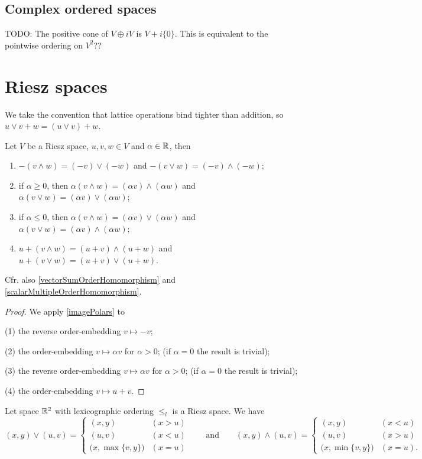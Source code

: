 \subsection{Complex ordered spaces}
TODO: The positive cone of $V\oplus iV$ is $V+i\{0\}$. This is equivalent to the pointwise ordering on $V^2$??


\section{Riesz spaces}

We take the convention that lattice operations bind tighter than addition, so $u\vee v + w = (u\vee v) + w$.

\begin{lemma} \label{lemmaRieszSpaces}
Let $V$ be a Riesz space, $u,v,w\in V$ and $\alpha\in \mathbb{R}$, then
\begin{enumerate}
\item $-(v \wedge w) = (-v)\vee (-w)$ and $-(v \vee w) = (-v)\wedge (-w)$;
\item if $\alpha \geq 0$, then $\alpha(v \wedge w) = (\alpha v)\wedge (\alpha w)$ and $\alpha(v \vee w) = (\alpha v)\vee (\alpha w)$;
\item if $\alpha \leq 0$, then $\alpha(v \wedge w) = (\alpha v)\vee (\alpha w)$ and $\alpha(v \vee w) = (\alpha v)\wedge (\alpha w)$;
\item $u+(v \wedge w) = (u+v)\wedge (u+w)$ and $u+(v \vee w) = (u+v)\vee (u+w)$.
\end{enumerate}
\end{lemma}
Cfr. also \ref{vectorSumOrderHomomorphism} and \ref{scalarMultipleOrderHomomorphism}.
\begin{proof}
We apply \ref{imagePolars} to

(1) the reverse order-embedding $v\mapsto -v$;

(2) the order-embedding $v\mapsto \alpha v$ for $\alpha > 0$; (if $\alpha = 0$ the result is trivial);

(3) the reverse order-embedding $v\mapsto \alpha v$ for $\alpha > 0$; (if $\alpha = 0$ the result is trivial);

(4) the order-embedding $v\mapsto u+v$.
\end{proof}

\begin{example}
Let space $\mathbb{R}^2$ with lexicographic ordering $\leq_l$ is a Riesz space. We have
\[ (x,y)\vee (u,v) = \begin{cases}
(x,y) & (x>u) \\ (u,v) & (x<u) \\ \big(x, \max\{v,y\}\big) & (x = u)
\end{cases} \qquad\text{and}\qquad (x,y)\wedge (u,v) = \begin{cases}
(x,y) & (x<u) \\ (u,v) & (x>u) \\ \big(x, \min\{v,y\}\big) & (x = u).
\end{cases} \]
\end{example}

